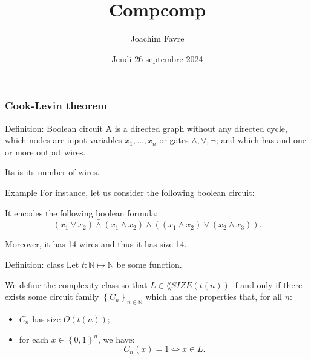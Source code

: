 \documentclass[a4paper]{article}
\title{Compcomp}
\author{Joachim Favre}
\date{Jeudi 26 septembre 2024}
\begin{document}
\maketitle


\subsubsection{Cook-Levin theorem}

\begin{parag}{Definition: Boolean circuit}
    A  is a directed graph without any directed cycle, which nodes are input variables $x_1, \ldots, x_n$ or gates $\land, \lor, \lnot$; and which has and one or more output wires.

    Its  is its number of wires.

    \begin{subparag}{Example}
        For instance, let us consider the following boolean circuit: 

        It encodes the following boolean formula:
        \[\bar{\left(x_1 \lor x_2\right) \land \left(x_1 \land x_2\right)}\land \left(\left(x_1 \land x_2\right) \lor \left(x_2 \land x_3\right)\right).\]

        Moreover, it has 14 wires and thus it has size 14.
    \end{subparag}
\end{parag}

\begin{parag}{Definition:  class}
    Let $t: \mathbb{N} \mapsto \mathbb{N}$ be some function.

    We define the  complexity class so that $L \in \lang{SIZE}\left(t\left(n\right)\right)$ if and only if there exists some circuit family $\left\{C_n\right\}_{n \in \mathbb{N}}$ which has the properties that, for all $n$:
    \begin{itemize}
        \item $C_n$ has size $O\left(t\left(n\right)\right)$;
        \item for each $x \in \left\{0, 1\right\}^n$, we have: 
        \[C_n\left(x\right) = 1 \iff x \in L.\]
    \end{itemize}
\end{parag}
\end{document}
